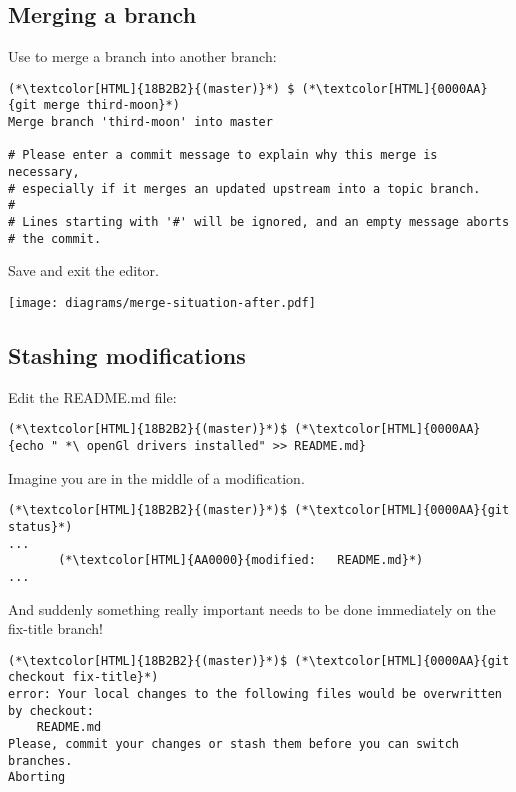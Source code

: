 \subsection{Merging a branch}
\begin{frame}[fragile]
  \subslidetitle

  Use  to merge a branch into another branch:

  \begin{lstlisting}
(*\textcolor[HTML]{18B2B2}{(master)}*) $ (*\textcolor[HTML]{0000AA}{git merge third-moon}*)
Merge branch 'third-moon' into master

# Please enter a commit message to explain why this merge is necessary,
# especially if it merges an updated upstream into a topic branch.
#
# Lines starting with '#' will be ignored, and an empty message aborts
# the commit.
\end{lstlisting}

  Save and exit the editor.
  \centerline{\texttt{[image: diagrams/merge-situation-after.pdf]}}

\end{frame}

\subsection{Stashing modifications}
\begin{frame}[fragile]
  \subslidetitle

  Edit the README.md file:
  \begin{lstlisting}
(*\textcolor[HTML]{18B2B2}{(master)}*)$ (*\textcolor[HTML]{0000AA}{echo " *\ openGl drivers installed" >> README.md}
\end{lstlisting}

  Imagine you are in the middle of a modification.

  \begin{lstlisting}
(*\textcolor[HTML]{18B2B2}{(master)}*)$ (*\textcolor[HTML]{0000AA}{git status}*)
...
       (*\textcolor[HTML]{AA0000}{modified:   README.md}*)
...
\end{lstlisting}

  And suddenly something really important needs to be done immediately on the fix-title branch!

  \begin{lstlisting}
(*\textcolor[HTML]{18B2B2}{(master)}*)$ (*\textcolor[HTML]{0000AA}{git checkout fix-title}*)
error: Your local changes to the following files would be overwritten by checkout:
	README.md
Please, commit your changes or stash them before you can switch branches.
Aborting
\end{lstlisting}
\end{frame}

